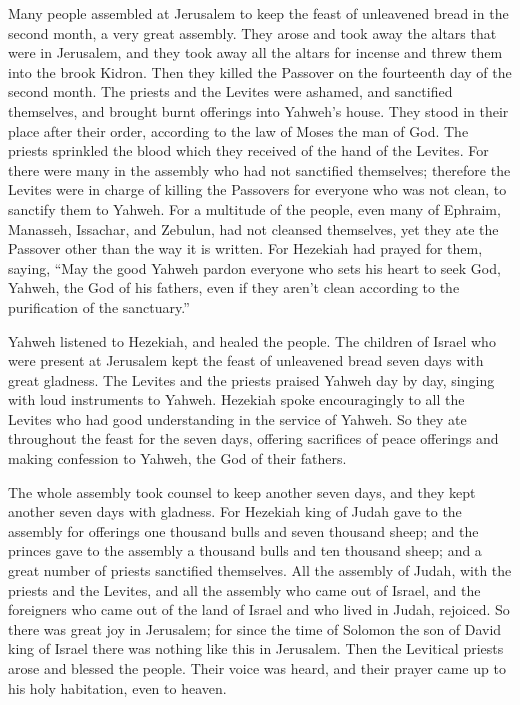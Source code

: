  Many people assembled at Jerusalem to keep the feast of
unleavened bread in the second month, a very great assembly.
 They arose and took away the altars that were in
Jerusalem, and they took away all the altars for incense and threw them
into the brook Kidron.  Then they killed the Passover on
the fourteenth day of the second month. The priests and the Levites were
ashamed, and sanctified themselves, and brought burnt offerings into
Yahweh's house.  They stood in their place after their
order, according to the law of Moses the man of God. The priests
sprinkled the blood which they received of the hand of the Levites.
 For there were many in the assembly who had not
sanctified themselves; therefore the Levites were in charge of killing
the Passovers for everyone who was not clean, to sanctify them to
Yahweh.  For a multitude of the people, even many of
Ephraim, Manasseh, Issachar, and Zebulun, had not cleansed themselves,
yet they ate the Passover other than the way it is written. For Hezekiah
had prayed for them, saying, ``May the good Yahweh pardon everyone
 who sets his heart to seek God, Yahweh, the God of his
fathers, even if they aren't clean according to the purification of the
sanctuary.''

 Yahweh listened to Hezekiah, and healed the people.
 The children of Israel who were present at Jerusalem
kept the feast of unleavened bread seven days with great gladness. The
Levites and the priests praised Yahweh day by day, singing with loud
instruments to Yahweh.  Hezekiah spoke encouragingly to
all the Levites who had good understanding in the service of Yahweh. So
they ate throughout the feast for the seven days, offering sacrifices of
peace offerings and making confession to Yahweh, the God of their
fathers.

 The whole assembly took counsel to keep another seven
days, and they kept another seven days with gladness. 
For Hezekiah king of Judah gave to the assembly for offerings one
thousand bulls and seven thousand sheep; and the princes gave to the
assembly a thousand bulls and ten thousand sheep; and a great number of
priests sanctified themselves.  All the assembly of
Judah, with the priests and the Levites, and all the assembly who came
out of Israel, and the foreigners who came out of the land of Israel and
who lived in Judah, rejoiced.  So there was great joy in
Jerusalem; for since the time of Solomon the son of David king of Israel
there was nothing like this in Jerusalem.  Then the
Levitical priests arose and blessed the people. Their voice was heard,
and their prayer came up to his holy habitation, even to heaven.

